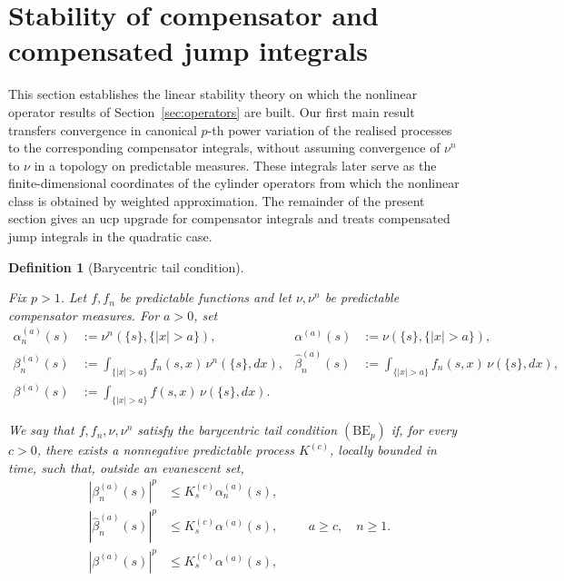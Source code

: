 \documentclass[a4paper,10pt]{article}
\newtheorem{defin}[thm]{Definition}
\begin{document}
\section{Stability of compensator and compensated jump integrals}\label{sec:integrals}

This section establishes the linear stability theory on which the
nonlinear operator results of Section~\ref{sec:operators} are built.
Our first main result transfers convergence in canonical \(p\)-th
power variation of the realised processes to the corresponding
compensator integrals, without assuming convergence of \(\nu^n\) to
\(\nu\) in a topology on predictable measures. These integrals later
serve as the finite-dimensional coordinates of the cylinder
operators from which the nonlinear class is obtained by weighted
approximation. The remainder of the present section gives an ucp
upgrade for compensator integrals and treats compensated jump
integrals in the quadratic case.


\begin{defin}[Barycentric tail condition]
\label{def:BEp}

Fix \(p>1\). Let \(f,f_n\) be predictable functions and let
\(\nu,\nu^n\) be predictable compensator measures. For \(a>0\), set
\[
\begin{aligned}
\alpha_n^{(a)}(s)
&:=
\nu^n(\{s\},\{|x|>a\}),
&
\alpha^{(a)}(s)
&:=
\nu(\{s\},\{|x|>a\}),
\\
\beta_n^{(a)}(s)
&:=
\int_{\{|x|>a\}}
f_n(s,x)\,\nu^n(\{s\},dx),
&
\widehat\beta_n^{(a)}(s)
&:=
\int_{\{|x|>a\}}
f_n(s,x)\,\nu(\{s\},dx),
\\
\beta^{(a)}(s)
&:=
\int_{\{|x|>a\}}
f(s,x)\,\nu(\{s\},dx).
\end{aligned}
\]

We say that \(f,f_n,\nu,\nu^n\) satisfy the barycentric tail
condition \((\mathrm{BE}_p)\) if, for every \(c>0\), there exists a
nonnegative predictable process \(K^{(c)}\), locally bounded in time,
such that, outside an evanescent set,
\[
\begin{aligned}
|\beta_n^{(a)}(s)|^p
&\le
K_s^{(c)}\alpha_n^{(a)}(s),
\\
|\widehat\beta_n^{(a)}(s)|^p
&\le
K_s^{(c)}\alpha^{(a)}(s),
\\
|\beta^{(a)}(s)|^p
&\le
K_s^{(c)}\alpha^{(a)}(s),
\end{aligned}
\qquad
a\ge c,\quad n\ge1.
\]
\end{defin}
\end{document}
